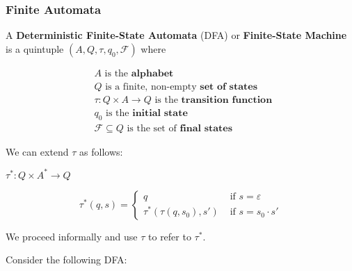 \subsubsection{Finite Automata}\label{subsubsec:finite-automata}

\begin{definition}
A \textbf{Deterministic Finite-State Automata} (DFA) or \textbf{Finite-State Machine} is a quintuple \((A, Q, \tau, q_0, \mathcal{F})\) where 

\begin{align*}
    &A\text{ is the }\textbf{alphabet}\\
    &Q\text{ is a finite, non-empty }\textbf{set of states}\\
    &\tau:Q\times A\to Q\text{ is the }\textbf{transition function }\\
    &q_0\text{ is the }\textbf{initial state}\\
    &\mathcal{F}\subseteq Q\text{ is the set of }\textbf{final states}
\end{align*}
\end{definition}
We can extend \(\tau\) as follows: 

\(\tau^*:Q\times A^*\to Q\)

\[\tau^*(q, s) = \begin{cases} q &\mbox{ if } s=\varepsilon\\
                             \tau^*(\tau(q, s_0), s') &\mbox{ if } s=s_0\cdot s'\end{cases}\]

We proceed informally and use \(\tau\) to refer to \(\tau^*\). 

Consider the following DFA:

\begin{center}\end{center}

